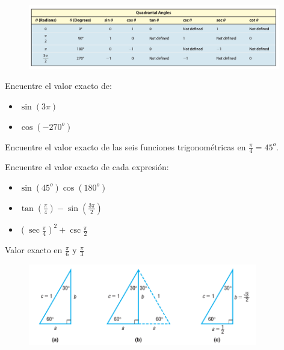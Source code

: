 {}
	\begin{figure}
		\centering
		\includegraphics[width=11cm,keepaspectratio=true]{./trig/sull06t2.png}
		\label{fig:06t2}
	\end{figure}
	

{}
	\begin{problema}
		\label{exmp:sull0603}
		Encuentre el valor exacto de:
		\begin{itemize}
			\item $\sin(3\pi)$ 
			\item $\cos(-270^{o})$
		\end{itemize}
	\end{problema}
	

{}
	\begin{problema}
		\label{exmp:sull0604}
		Encuentre el valor exacto de las seis funciones trigonométricas en $\frac{\pi}{4}=45^{o}$.
	\end{problema}
	

	\begin{problema}
		\label{exmp:sull0605}
		Encuentre el valor exacto de cada expresión:
		\begin{itemize}
			\item $\sin(45^{o})\cos(180^{o})$
			\item $\tan\left( \frac{\pi}{4} \right)-\sin\left( \frac{3\pi}{2} \right)$
			\item $\left( \sec\frac{\pi}{4} \right)^{2}+\csc\frac{\pi}{2}$
		\end{itemize}
		
	\end{problema}
	

{Valor exacto en $\frac{\pi}{6}$ y $\frac{\pi}{3}$}
	\begin{figure}
		\centering
		\includegraphics[width=10cm,keepaspectratio=true]{./trig/sull0624.png}
		\label{fig:0624}
	\end{figure}
	

